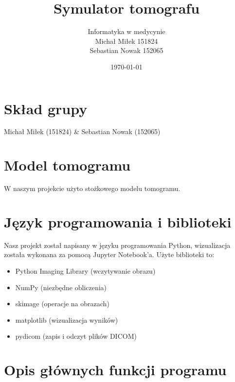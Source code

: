 \documentclass[a4paper,11pt]{article}
\title{Symulator tomografu}
\author{Informatyka w medycynie \\ Michał Miłek 151824 \\ Sebastian Nowak 152065}
\date{\today}
\begin{document}
    \maketitle
    \section{Skład grupy}
    Michał Miłek (151824) \& Sebastian Nowak (152065)

    \section{Model tomogramu}
    W naszym projekcie użyto stożkowego modelu tomogramu.

    \section{Język programowania i biblioteki}
    Nasz projekt został napisany w języku programowania Python,
    wizualizacja została wykonana za pomocą Jupyter Notebook'a.
    Użyte biblioteki to:
    \begin{itemize}
    \item Python Imaging Library (wczytywanie obrazu)
    \item NumPy (niezbędne obliczenia)
    \item skimage (operacje na obrazach)
    \item matplotlib (wizualizacja wyników)
    \item pydicom (zapis i odczyt plików DICOM)
    \end{itemize}

    \section{Opis głównych funkcji programu}
\end{document}
